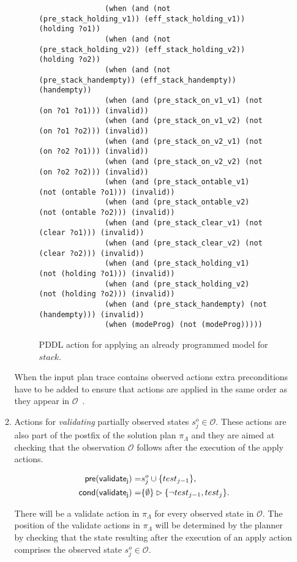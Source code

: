 \documentclass[runningheads]{llncs}
\newcommand{\pre}{\mathsf{pre}}     %
\newcommand{\cond}{\mathsf{cond}}   %
\begin{document}
\begin{itemize}
\begin{enumerate}
\begin{figure}[hbt!]
\begin{center}
\begin{scriptsize}
\begin{verbatim}
               (when (and (not (pre_stack_holding_v1)) (eff_stack_holding_v1)) (holding ?o1))
               (when (and (not (pre_stack_holding_v2)) (eff_stack_holding_v2)) (holding ?o2))
               (when (and (not (pre_stack_handempty)) (eff_stack_handempty)) (handempty))
               (when (and (pre_stack_on_v1_v1) (not (on ?o1 ?o1))) (invalid))
               (when (and (pre_stack_on_v1_v2) (not (on ?o1 ?o2))) (invalid))
               (when (and (pre_stack_on_v2_v1) (not (on ?o2 ?o1))) (invalid))
               (when (and (pre_stack_on_v2_v2) (not (on ?o2 ?o2))) (invalid))
               (when (and (pre_stack_ontable_v1) (not (ontable ?o1))) (invalid))
               (when (and (pre_stack_ontable_v2) (not (ontable ?o2))) (invalid))
               (when (and (pre_stack_clear_v1) (not (clear ?o1))) (invalid))
               (when (and (pre_stack_clear_v2) (not (clear ?o2))) (invalid))
               (when (and (pre_stack_holding_v1) (not (holding ?o1))) (invalid))
               (when (and (pre_stack_holding_v2) (not (holding ?o2))) (invalid))
               (when (and (pre_stack_handempty) (not (handempty))) (invalid))
               (when (modeProg) (not (modeProg)))))
\end{verbatim}
\end{scriptsize}
 \caption{\small PDDL action for applying an already programmed model for $stack$.}
\label{fig:compilation}
\end{center}
\end{figure}


When the input plan trace contains observed actions extra preconditions have to be added to ensure that actions are applied in the same order as they appear in $\mathcal{O}$~\cite{aineto2018learning}.\\

\item Actions for {\em validating} partially observed states $s_j^o\in\mathcal{O}$. These actions are also part of the postfix of the solution plan $\pi_\Lambda$ and they are aimed at checking that the observation $\mathcal{O}$ follows after the execution of the apply actions.

\begin{small}
\begin{align*}
\hspace*{7pt}\pre(\mathsf{validate_{j}})=&s_j^o\cup\{test_{j-1}\},\\
\cond(\mathsf{validate_{j}})=&\{\emptyset\}\rhd\{\neg test_{j-1}, test_j\}.
\end{align*}
\end{small}

There will be a validate action in $\pi_\Lambda$ for every observed state in $\mathcal{O}$. The position of the validate actions in $\pi_\Lambda$ will be determined by the planner by checking that the state resulting after the execution of an apply action comprises the observed state $s_j^o\in\mathcal{O}$.

\end{enumerate}
\end{itemize}
\end{document}
